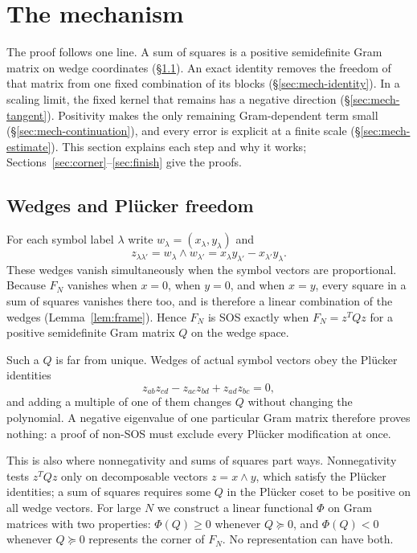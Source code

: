 \section{The mechanism}\label{sec:mechanism}
The proof follows one line. A sum of squares is a positive semidefinite
Gram matrix on wedge coordinates (\S\ref{sec:mech-wedges}). An exact
identity removes the freedom of that matrix from one fixed combination
of its blocks (\S\ref{sec:mech-identity}).
In a scaling limit, the fixed kernel that remains has a negative direction
(\S\ref{sec:mech-tangent}). Positivity makes the only remaining
Gram-dependent term small (\S\ref{sec:mech-continuation}), and every error is explicit at a finite
scale (\S\ref{sec:mech-estimate}). This section explains each step and
why it works; Sections~\ref{sec:corner}--\ref{sec:finish} give the proofs.

\subsection{Wedges and Pl\"ucker freedom}\label{sec:mech-wedges}
For each symbol label $\lambda$ write $w_\lambda=(x_\lambda,y_\lambda)$ and
\[
 z_{\lambda\lambda'}=w_\lambda\wedge w_{\lambda'}=x_\lambda y_{\lambda'}-x_{\lambda'} y_\lambda .
\]
These wedges vanish simultaneously when the symbol vectors are
proportional. Because $F_N$ vanishes when $x=0$, when $y=0$, and when
$x=y$, every square in a sum of squares vanishes there too, and is
therefore a linear combination of the wedges (Lemma~\ref{lem:frame}).
Hence $F_N$ is SOS exactly when $F_N=z^TQz$ for a positive semidefinite
Gram matrix $Q$ on the wedge space.

Such a $Q$ is far from unique. Wedges of actual symbol vectors obey the
Pl\"ucker identities
\[
 z_{ab}z_{cd}-z_{ac}z_{bd}+z_{ad}z_{bc}=0,
\]
and adding a multiple of one of them changes $Q$ without changing the
polynomial. A negative eigenvalue of one particular Gram matrix therefore
proves nothing: a proof of non-SOS must exclude every Pl\"ucker
modification at once.

This is also where nonnegativity and sums of squares part ways.
Nonnegativity tests $z^TQz$ only on decomposable vectors $z=x\wedge y$,
which satisfy the Pl\"ucker identities; a sum of squares requires some
$Q$ in the Pl\"ucker coset to be positive on all wedge vectors. For large
$N$ we construct a linear functional $\Phi$ on Gram matrices with two
properties: $\Phi(Q)\ge0$ whenever $Q\succeq0$, and $\Phi(Q)<0$ whenever
$Q\succeq0$ represents the corner of $F_N$. No representation can have
both.

